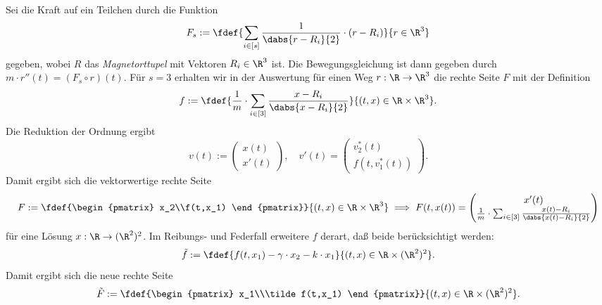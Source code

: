 \documentclass{article}
\begin{document}
    \aufgabe{}
        \subaufgabe{}
            Sei die Kraft auf ein Teilchen durch die Funktion
            \[F_s:=\fdef{\sum_{i\in[s]}\frac{1}{\dabs{r - R_i}{2}}\cdot (r-R_i)}{r\in\R^3}\]
            gegeben, wobei $R$ das \emph{Magnetorttupel} mit Vektoren $R_i\in\R^3$ ist. Die Bewegungsgleichung ist dann gegeben durch $m\cdot r''(t) = (F_s\circ r)(t)$. Für $s = 3$ erhalten wir in der Auswertung für einen Weg $r:\R\to\R^3$ die rechte Seite $F$ mit der Definition
            \[f:=\fdef{\frac{1}{m}\cdot\sum_{i\in[3]}\frac{x-R_i}{\dabs{x-R_i}{2}}}{(t,x)\in\R\times\R^3}.\]
            Die Reduktion der Ordnung ergibt
            \[v(t):=\begin{pmatrix}
                x(t)\\x'(t)
            \end{pmatrix},\quad v'(t)=\begin{pmatrix}
                v_2^*(t)\\f(t,v_1^*(t))
            \end{pmatrix}.\]
            Damit ergibt sich die vektorwertige rechte Seite
            \[F:=\fdef{\begin{pmatrix}
                x_2\\f(t,x_1)
            \end{pmatrix}}{(t,x)\in\R\times\R^3}\implies F(t,x(t)) = \begin{pmatrix}
                x'(t)\\\frac{1}{m}\cdot\sum_{i\in[3]}\frac{x(t)-R_i}{\dabs{x(t)-R_i}{2}}
            \end{pmatrix}\]
            für eine Lösung $x:\R\to(\R^2)^2$. Im Reibungs- und Federfall erweitere $f$ derart, daß beide berücksichtigt werden:
            \[\tilde f:=\fdef{f(t,x_1) - \gamma\cdot x_2 - k\cdot x_1}{(t,x)\in\R\times(\R^2)^2}.\]
            Damit ergibt sich die neue rechte Seite
            \[\tilde F:=\fdef{\begin{pmatrix}
                x_1\\\tilde f(t,x_1)
            \end{pmatrix}}{(t,x)\in\R\times(\R^2)^2}.\]
\end{document}
